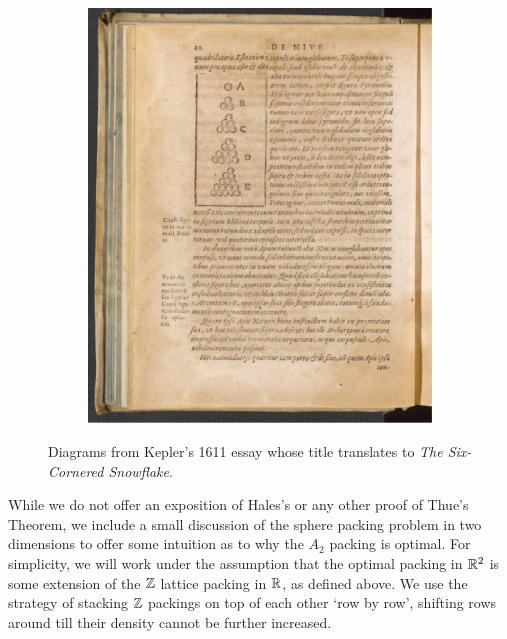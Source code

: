 \begin{figure}
\begin{subfigure}{\linewidth}
        \includegraphics[width=\linewidth]{Chapters/1_Intro/Images/Kepler_2.pdf}
        \caption{}
        \label{Ch1:Subfig:Kepler_Original_2}
    \end{subfigure}
    \caption{Diagrams from Kepler's 1611 essay \cite{KeplerSnowflake} whose title translates to \textit{The Six-Cornered Snowflake}.}
\end{figure}

While we do not offer an exposition of Hales's or any other proof of Thue's Theorem, we include a small discussion of the sphere packing problem in two dimensions to offer some intuition as to why the $A_2$ packing is optimal. For simplicity, we will work under the assumption that the optimal packing in $\mathbb{R}^2$ is some extension of the $\mathbb{Z}$ lattice packing in $\mathbb{R}$, as defined above. We use the strategy of stacking $\mathbb{Z}$ packings on top of each other `row by row', shifting rows around till their density cannot be further increased.

